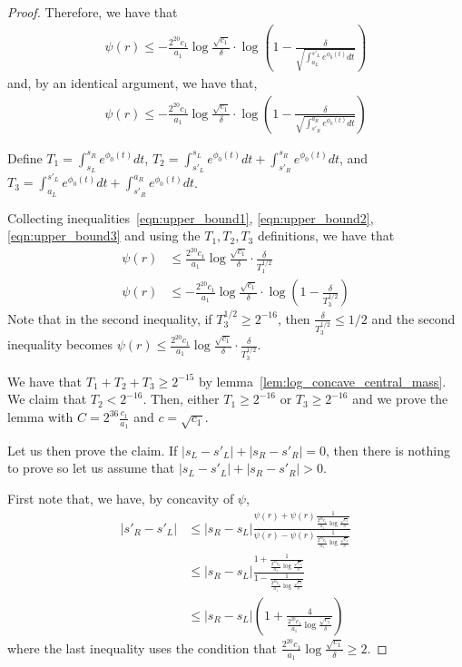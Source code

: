 \documentclass[12pt]{article}
\begin{document}
\begin{proof}
  Therefore, we have that
  \begin{align}
    \psi(r) \leq   -  \frac{2^{20} c_1}{a_1} \log \frac{\sqrt{c_1}}{\delta} \cdot
    \log \left(1-  \frac{\delta}{ \sqrt{ \int_{a_L}^{s'_L} e^{\phi_0(t)} dt }} \right) \label{eqn:upper_bound2}
  \end{align}
  and, by an identical argument, we have that,
  \begin{align}
       \psi(r) \leq   -  \frac{2^{20} c_1}{a_1} \log \frac{\sqrt{c_1}}{\delta} \cdot
    \log \left(1-  \frac{\delta}{ \sqrt{ \int_{s'_R}^{a_R} e^{\phi_0(t)} dt }} \right) \label{eqn:upper_bound3}
  \end{align}


  Define $T_1 = \int_{s_L}^{s_R} e^{\phi_0(t)} dt$, $T_2 = \int_{s'_L}^{s_L} e^{\phi_0(t)} dt +  \int_{s'_R}^{s_R} e^{\phi_0(t)} dt$,
  and $T_3 = \int_{a_L}^{s'_L} e^{\phi_0(t)} dt + \int_{s'_R}^{a_R} e^{\phi_0(t)} dt$.

  Collecting inequalities~\ref{eqn:upper_bound1}, \ref{eqn:upper_bound2}, \ref{eqn:upper_bound3} and using the $T_1, T_2, T_3$ definitions, we have that
  \begin{align*}
    \psi(r) &\leq  \frac{2^{20} c_1}{a_1} \log \frac{\sqrt{c_1}}{\delta} \cdot \frac{ \delta}{ T_1^{1/2} } \\
    \psi(r) &\leq - \frac{2^{20} c_1}{a_1} \log  \frac{\sqrt{c_1}}{\delta} \cdot \log \left( 1 - \frac{\delta}{T^{1/2}_3} \right)
  \end{align*}
  Note that in the second inequality, if $T^{1/2}_3 \geq 2^{-16}$, then $\frac{\delta}{T^{1/2}_3} \leq 1/2$ and the second inequality becomes $\psi(r) \leq  \frac{2^{20} c_1}{a_1} \log  \frac{\sqrt{c_1}}{\delta} \cdot  \frac{\delta}{T^{1/2}_3} $.
  
  
  We have that $T_1 + T_2 + T_3 \geq 2^{-15}$ by lemma~\ref{lem:log_concave_central_mass}. We claim that $T_2 < 2^{-16}$. Then, either $T_1 \geq 2^{-16}$ or $T_3 \geq 2^{-16}$ and we prove the lemma with $C = 2^{36}
  \frac{c_1}{a_1} $ and $c = \sqrt{c_1}$.
  

  Let us then prove the claim. If $|s_L-s'_L| + |s_R - s'_R| = 0$, then there is nothing to prove so let us assume that  $|s_L-s'_L| + |s_R - s'_R| > 0$.

  First note that, we have, by concavity of $\psi$,
  \begin{align*}
    |s'_R - s'_L| &\leq |s_R - s_L| \frac{ \psi(r) + \psi(r)
                    \frac{1}{\frac{2^{20} c_1}{a_1} \log \frac{\sqrt{c_1}}{\delta}}}
                    {\psi(r) - \psi(r)
                    \frac{1}{\frac{2^{20} c_1}{a_1} \log \frac{\sqrt{c_1}}{\delta}}} \\
    &\leq |s_R - s_L| \frac{ 1 + \frac{1}{\frac{2^{20} c_1}{a_1} \log \frac{\sqrt{c_1}}{\delta}}}
      {1 - \frac{1}{\frac{2^{20} c_1}{a_1} \log \frac{\sqrt{c_1}}{\delta}}} \\
    &\leq |s_R - s_L| \left( 1 + \frac{4}{\frac{2^{20} c_1}{a_1} \log \frac{\sqrt{c_1}}{\delta}} \right)
  \end{align*}
  where the last inequality uses the condition that $\frac{2^{20} c_1}{a_1} \log \frac{\sqrt{c_1}}{\delta} \geq 2$.
  

\end{proof}
\end{document}
